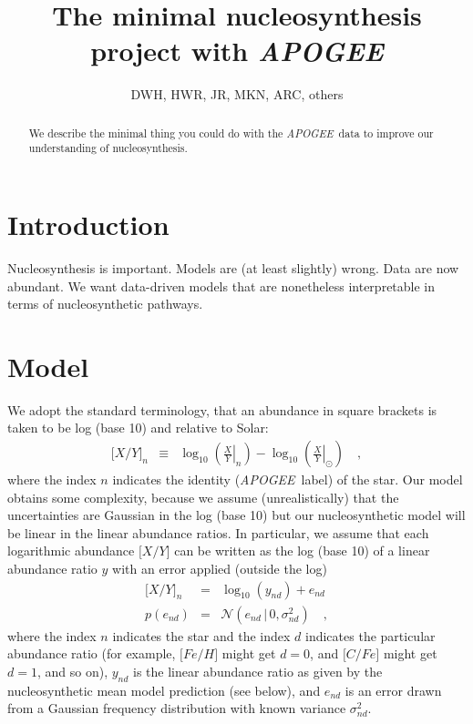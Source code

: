 \documentclass[12pt, preprint]{aastex}
\newcommand{\acronym}[1]{{\small{#1}}}
\newcommand{\project}[1]{\textsl{#1}}
\newcommand{\apogee}{\project{\acronym{APOGEE}}}
\newcommand{\solar}{\odot}
\newcommand{\abundance}[1]{\lbrack{#1}\rbrack}
\newcommand{\given}{\,|\,}
\newcommand{\normal}{\mathcal{N}}
\begin{document}
\title{The minimal nucleosynthesis project with \apogee}
\author{DWH, HWR, JR, MKN, ARC, others}

\begin{abstract}
We describe the minimal thing you could do with the \apogee\ data to
improve our understanding of nucleosynthesis.
\end{abstract}


\section{Introduction}

Nucleosynthesis is important.  Models are (at least slightly) wrong.
Data are now abundant.  We want data-driven models that are
nonetheless interpretable in terms of nucleosynthetic pathways.

\section{Model}

We adopt the standard terminology, that an abundance in square brackets
is taken to be log (base 10) and relative to Solar:
\begin{eqnarray}
  \abundance{X/Y}_n &\equiv& \log_{10}\left(\left.\frac{X}{Y}\right|_n\right) -
                             \log_{10}\left(\left.\frac{X}{Y}\right|_\solar\right)
\quad ,
\end{eqnarray}
where the index $n$ indicates the identity (\apogee\ label) of the star.
Our model obtains some complexity, because we assume (unrealistically)
that the uncertainties are Gaussian in the log (base 10) but our
nucleosynthetic model will be linear in the linear abundance ratios.
In particular, we assume that each logarithmic abundance $\abundance{X/Y}$
can be written as the log (base 10) of a linear abundance ratio $y$ with
an error applied (outside the log)
\begin{eqnarray}
  \abundance{X/Y}_n &=& \log_{10}(y_{nd}) + e_{nd} \label{eq:model1}
\\
  p(e_{nd}) &=& \normal(e_{nd}\given 0,\sigma^2_{nd}) \label{eq:model2}
\quad ,
\end{eqnarray}
where the index $n$ indicates the star and the index $d$ indicates the
particular abundance ratio (for example, $\abundance{Fe/H}$ might get
$d=0$, and $\abundance{C/Fe}$ might get $d=1$, and so on), $y_{nd}$ is
the linear abundance ratio as given by the nucleosynthetic mean model
prediction (see below), and $e_{nd}$ is an error drawn from a Gaussian
frequency distribution with known variance $\sigma^2_{nd}$.
\end{document}
